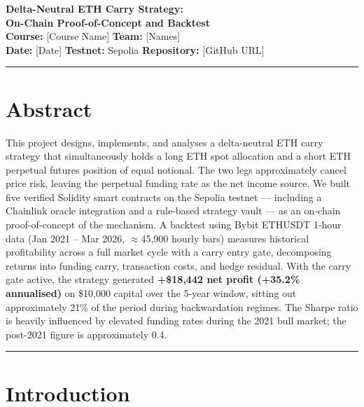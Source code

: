 \documentclass[11pt,a4paper]{article}
\begin{document}

\begin{center}
    {\LARGE\bfseries Delta-Neutral ETH Carry Strategy:\\[4pt]
    On-Chain Proof-of-Concept and Backtest}\\[12pt]
    {\normalsize
        \textbf{Course:} [Course Name] \quad
        \textbf{Team:} [Names]\\[4pt]
        \textbf{Date:} [Date] \quad
        \textbf{Testnet:} Sepolia \quad
        \textbf{Repository:} [GitHub URL]
    }
\end{center}
\hrule
\vspace{10pt}

\section*{Abstract}

This project designs, implements, and analyses a delta-neutral ETH carry strategy that simultaneously holds a long ETH spot allocation and a short ETH perpetual futures position of equal notional. The two legs approximately cancel price risk, leaving the perpetual funding rate as the net income source. We built five verified Solidity smart contracts on the Sepolia testnet --- including a Chainlink oracle integration and a rule-based strategy vault --- as an on-chain proof-of-concept of the mechanism. A backtest using Bybit ETHUSDT 1-hour data (Jan 2021 -- Mar 2026, $\approx$45,900 hourly bars) measures historical profitability across a full market cycle with a carry entry gate, decomposing returns into funding carry, transaction costs, and hedge residual. With the carry gate active, the strategy generated \textbf{+\$18,442 net profit (+35.2\% annualised)} on \$10,000 capital over the 5-year window, sitting out approximately 21\% of the period during backwardation regimes. The Sharpe ratio is heavily influenced by elevated funding rates during the 2021 bull market; the post-2021 figure is approximately 0.4.

\hrule\vspace{6pt}

\section{Introduction}
\end{document}
